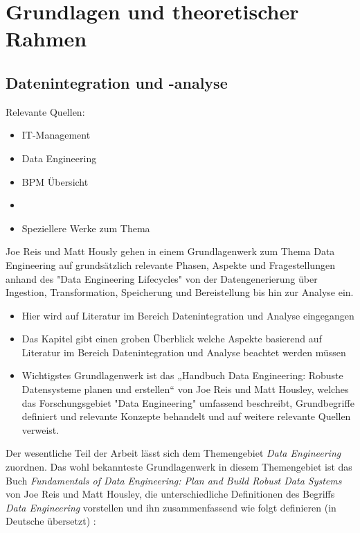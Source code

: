 \chapter{Grundlagen und theoretischer Rahmen}
\label{StandDerForschung}

\section{Datenintegration und -analyse}
Relevante Quellen:
\begin{itemize}
    \item IT-Management\cite{tiemeyer2023}
    \item Data Engineering \cite{reis2023}
    \item BPM Übersicht \cite{weske2019}
    \item 
    \item Speziellere Werke zum Thema
\end{itemize}


Joe Reis und Matt Hously gehen in einem Grundlagenwerk zum Thema Data Engineering auf grundsätzlich relevante Phasen, Aspekte und Fragestellungen anhand des "Data Engineering Lifecycles" von der Datengenerierung über Ingestion, Transformation, Speicherung und Bereistellung bis hin zur Analyse ein. \cite{reis2023} 


\begin{itemize}
\item Hier wird auf Literatur im Bereich Datenintegration und Analyse eingegangen
\item Das Kapitel gibt einen groben Überblick welche Aspekte basierend auf Literatur im Bereich Datenintegration und Analyse beachtet werden müssen
\item Wichtigstes Grundlagenwerk ist das „Handbuch Data Engineering: Robuste Datensysteme planen und erstellen“ von Joe Reis und Matt Housley, welches das Forschungsgebiet "Data Engineering" umfassend beschreibt, Grundbegriffe definiert und relevante Konzepte behandelt und auf weitere relevante Quellen verweist.
\end{itemize}

Der wesentliche Teil der Arbeit lässt sich dem Themengebiet \textit{Data Engineering} zuordnen. Das wohl bekannteste Grundlagenwerk in diesem Themengebiet ist das Buch \textit{Fundamentals of Data Engineering: Plan and Build Robust Data Systems} von Joe Reis und Matt Housley, die unterschiedliche Definitionen des Begriffs \textit{Data Engineering} vorstellen und ihn zusammenfassend wie folgt definieren (in Deutsche übersetzt) \cite{reis2023}:

